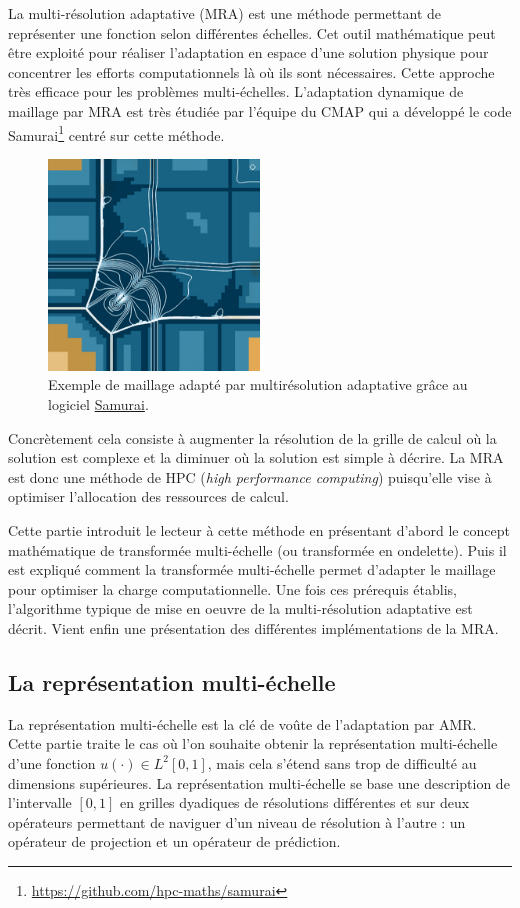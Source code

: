 La multi-résolution adaptative (MRA) est une méthode permettant de représenter une fonction selon différentes échelles.
Cet outil mathématique peut être exploité pour réaliser l'adaptation en espace d'une solution physique pour concentrer les efforts computationnels là où ils sont nécessaires. 
Cette approche très efficace pour les problèmes multi-échelles.
L'adaptation dynamique de maillage par MRA est très étudiée par l'équipe du CMAP qui a développé le code Samurai\footnote{\href{https://github.com/hpc-maths/samurai}{https://github.com/hpc-maths/samurai}}
centré sur cette méthode.
\begin{figure}[h]
    \centering
    \includegraphics[width=0.5\textwidth]{media/3_/3_/exemple_compression_samurai.png}
    \caption{Exemple de maillage adapté par multirésolution adaptative grâce au logiciel \href{https://github.com/hpc-maths/samurai}{Samurai}.}
    \label{fig:samurai}
\end{figure}
Concrètement cela consiste à augmenter la résolution de la grille de calcul où la solution est complexe et la diminuer où la solution est simple à décrire.
La MRA est donc une méthode de HPC (\textit{high performance computing}) puisqu'elle vise à optimiser l'allocation des ressources de calcul.\par
Cette partie introduit le lecteur à cette méthode en présentant d'abord le concept mathématique de transformée multi-échelle (ou transformée en ondelette). 
Puis il est expliqué comment la transformée multi-échelle permet d'adapter le maillage pour optimiser la charge computationnelle.
Une fois ces prérequis établis, l'algorithme typique de mise en oeuvre de la multi-résolution adaptative est décrit.
Vient enfin une présentation des différentes implémentations de la MRA.

\subsection{La représentation multi-échelle}
    La représentation multi-échelle est la clé de voûte de l'adaptation par AMR.
    Cette partie traite le cas où l'on souhaite obtenir la représentation multi-échelle d'une fonction $u(\cdot) \in L^2{[0,1]}$, 
    mais cela s'étend sans trop de difficulté au dimensions supérieures.
    La représentation multi-échelle se base une description de l'intervalle $[0,1]$ en grilles dyadiques de résolutions différentes
    et sur deux opérateurs permettant de naviguer d'un niveau de résolution à l'autre : un opérateur de projection et un opérateur de prédiction.
